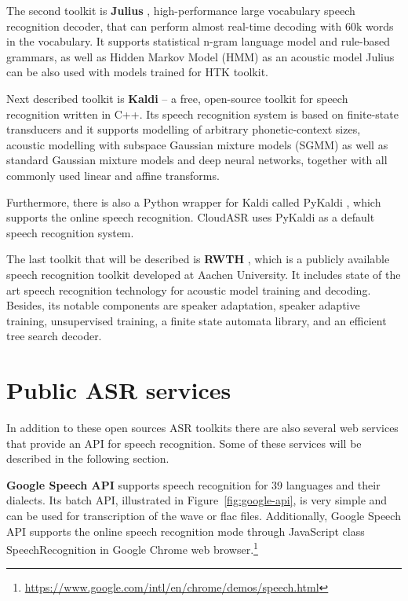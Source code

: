 The second toolkit is \textbf{Julius} \cite{lee2001julius}, high-performance large vocabulary speech recognition decoder,
  that can perform almost real-time decoding with 60k words in the vocabulary.
It supports statistical n-gram language model and rule-based grammars,
  as well as Hidden Markov Model (HMM) as an acoustic model
Julius can be also used with models trained for HTK toolkit.

Next described toolkit is \textbf{Kaldi} \cite{povey2011kaldi} -- a free, open-source toolkit for speech recognition written in C++.
Its speech recognition system is based on finite-state transducers
  and it supports modelling of arbitrary phonetic-context sizes,
  acoustic modelling with subspace Gaussian mixture models (SGMM)
  as well as standard Gaussian mixture models and deep neural networks,
  together with all commonly used linear and affine transforms.

Furthermore, there is also a Python wrapper for Kaldi called PyKaldi \cite{platek2014free},
  which supports the online speech recognition.
CloudASR uses PyKaldi as a default speech recognition system.

The last toolkit that will be described is \textbf{RWTH} \cite{rybach2009rwth},
  which is a publicly available speech recognition toolkit developed at Aachen University.
It includes state of the art speech recognition technology for acoustic model training and decoding.
Besides, its notable components are speaker adaptation,
  speaker adaptive training,
  unsupervised training,
  a finite state automata library,
  and an efficient tree search decoder.


\section{Public ASR services}
In addition to these open sources ASR toolkits
  there are also several web services that provide an API for speech recognition.
Some of these services will be described in the following section.

\textbf{Google Speech API} supports speech recognition for 39 languages and their dialects.
Its batch API, illustrated in Figure~\ref{fig:google-api}, is very simple and can be used for transcription of the wave or flac files.
Additionally,
  Google Speech API supports the online speech recognition mode through JavaScript class SpeechRecognition in Google Chrome web browser.\footnote{\url{https://www.google.com/intl/en/chrome/demos/speech.html}}


